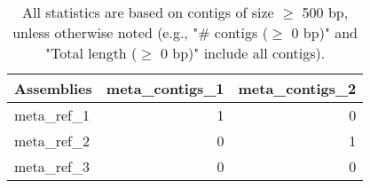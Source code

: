 \documentclass[12pt,a4paper]{article}
\begin{document}
\begin{table}[ht]
\begin{center}
\caption{All statistics are based on contigs of size $\geq$ 500 bp, unless otherwise noted (e.g., "\# contigs ($\geq$ 0 bp)" and "Total length ($\geq$ 0 bp)" include all contigs).}
\begin{tabular}{|l*{2}{|r}|}
\hline
Assemblies & meta\_contigs\_1 & meta\_contigs\_2 \\ \hline
meta\_ref\_1 & 1 & 0 \\ \hline
meta\_ref\_2 & 0 & 1 \\ \hline
meta\_ref\_3 & 0 & 0 \\ \hline
\end{tabular}
\end{center}
\end{table}
\end{document}
